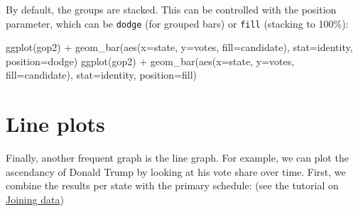 \documentclass[
]{article}
\newenvironment{Shaded}{\begin{snugshade}}{\end{snugshade}}
\newcommand{\AttributeTok}[1]{\textcolor[rgb]{0.77,0.63,0.00}{#1}}
\newcommand{\FunctionTok}[1]{\textcolor[rgb]{0.00,0.00,0.00}{#1}}
\newcommand{\NormalTok}[1]{#1}
\newcommand{\SpecialCharTok}[1]{\textcolor[rgb]{0.00,0.00,0.00}{#1}}
\newcommand{\StringTok}[1]{\textcolor[rgb]{0.31,0.60,0.02}{#1}}
\begin{document}
By default, the groups are stacked. This can be controlled with the
position parameter, which can be \texttt{dodge} (for grouped bars) or
\texttt{fill} (stacking to 100\%):

\begin{Shaded}
\begin{Highlighting}[]
\FunctionTok{ggplot}\NormalTok{(gop2) }\SpecialCharTok{+} 
  \FunctionTok{geom\_bar}\NormalTok{(}\FunctionTok{aes}\NormalTok{(}\AttributeTok{x=}\NormalTok{state, }\AttributeTok{y=}\NormalTok{votes, }\AttributeTok{fill=}\NormalTok{candidate), }
           \AttributeTok{stat=}\StringTok{\textquotesingle{}identity\textquotesingle{}}\NormalTok{, }
           \AttributeTok{position=}\StringTok{\textquotesingle{}dodge\textquotesingle{}}\NormalTok{)}
\FunctionTok{ggplot}\NormalTok{(gop2) }\SpecialCharTok{+} 
  \FunctionTok{geom\_bar}\NormalTok{(}\FunctionTok{aes}\NormalTok{(}\AttributeTok{x=}\NormalTok{state, }\AttributeTok{y=}\NormalTok{votes, }\AttributeTok{fill=}\NormalTok{candidate), }
           \AttributeTok{stat=}\StringTok{\textquotesingle{}identity\textquotesingle{}}\NormalTok{, }
           \AttributeTok{position=}\StringTok{\textquotesingle{}fill\textquotesingle{}}\NormalTok{)}
\end{Highlighting}
\end{Shaded}

\hypertarget{line-plots}{%
\section{Line plots}\label{line-plots}}

Finally, another frequent graph is the line graph. For example, we can
plot the ascendancy of Donald Trump by looking at his vote share over
time. First, we combine the results per state with the primary schedule:
(see the tutorial on \href{R-tidy-13a-joining.md}{Joining data})
\end{document}
